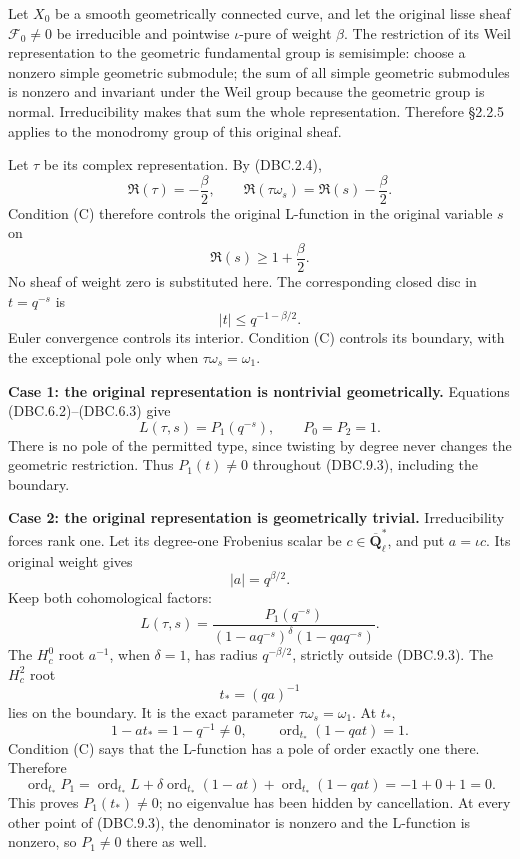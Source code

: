 \documentclass[
]{report}
\begin{document}
Let \(X_0\) be a smooth geometrically connected curve, and let the
original lisse sheaf \(\mathcal F_0\ne0\) be irreducible and pointwise
\(\iota\)-pure of weight \(\beta\). The restriction of its Weil
representation to the geometric fundamental group is semisimple: choose
a nonzero simple geometric submodule; the sum of all simple geometric
submodules is nonzero and invariant under the Weil group because the
geometric group is normal. Irreducibility makes that sum the whole
representation. Therefore §2.2.5 applies to the monodromy group of this
original sheaf.

Let \(\tau\) be its complex representation. By (DBC.2.4), \[
\Re(\tau)=-\frac\beta2,
\qquad
\Re(\tau\omega_s)=\Re(s)-\frac\beta2.
\tag{DBC.9.1}
\] Condition (C) therefore controls the original L-function in the
original variable \(s\) on \[
\Re(s)\ge1+\frac\beta2.
\tag{DBC.9.2}
\] No sheaf of weight zero is substituted here. The corresponding closed
disc in \(t=q^{-s}\) is \[
|t|\le q^{-1-\beta/2}.
\tag{DBC.9.3}
\] Euler convergence controls its interior. Condition (C) controls its
boundary, with the exceptional pole only when \(\tau\omega_s=\omega_1\).

\textbf{Case 1: the original representation is nontrivial
geometrically.} Equations (DBC.6.2)--(DBC.6.3) give \[
L(\tau,s)=P_1(q^{-s}),\qquad P_0=P_2=1.
\] There is no pole of the permitted type, since twisting by degree
never changes the geometric restriction. Thus \(P_1(t)\ne0\) throughout
(DBC.9.3), including the boundary.

\textbf{Case 2: the original representation is geometrically trivial.}
Irreducibility forces rank one. Let its degree-one Frobenius scalar be
\(c\in\overline{\mathbf Q}_\ell^*\), and put \(a=\iota c\). Its original
weight gives \[
|a|=q^{\beta/2}.
\tag{DBC.9.4}
\] Keep both cohomological factors: \[
L(\tau,s)=
\frac{P_1(q^{-s})}
 {(1-aq^{-s})^\delta(1-qa q^{-s})}.
\tag{DBC.9.5}
\] The \(H_c^0\) root \(a^{-1}\), when \(\delta=1\), has radius
\(q^{-\beta/2}\), strictly outside (DBC.9.3). The \(H_c^2\) root \[
t_*=(qa)^{-1}
\tag{DBC.9.6}
\] lies on the boundary. It is the exact parameter
\(\tau\omega_s=\omega_1\). At \(t_*\), \[
1-a t_*=1-q^{-1}\ne0,
\qquad
\operatorname{ord}_{t_*}(1-qa t)=1.
\] Condition (C) says that the L-function has a pole of order exactly
one there. Therefore \[
\operatorname{ord}_{t_*}P_1
=\operatorname{ord}_{t_*}L
 +\delta\operatorname{ord}_{t_*}(1-at)
 +\operatorname{ord}_{t_*}(1-qa t)
=-1+0+1=0.
\tag{DBC.9.7}
\] This proves \(P_1(t_*)\ne0\); no eigenvalue has been hidden by
cancellation. At every other point of (DBC.9.3), the denominator is
nonzero and the L-function is nonzero, so \(P_1\ne0\) there as well.
\end{document}
